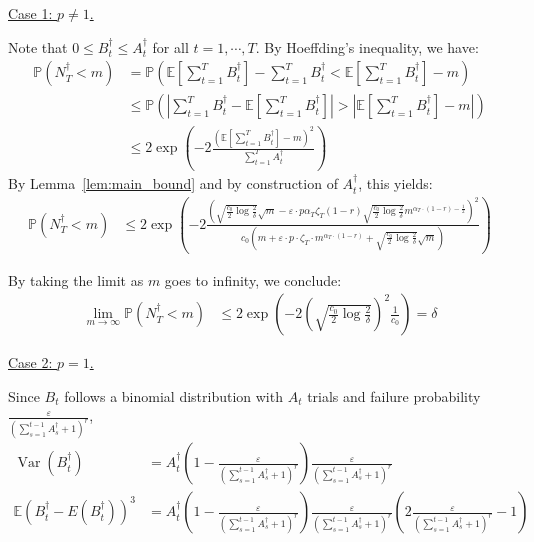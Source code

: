 \documentclass[nonblindrev]{informs3noheader}
\DeclareMathOperator{\Var}{Var}
\def\E{\mathbb{E}}
\def\P{\mathbb{P}}
\begin{document}
\underline{Case 1: $p\neq 1$.}

Note that $0\leq B^\dagger_t\leq A^\dagger_t$ for all $t=1,\cdots,T$. By Hoeffding's inequality, we have:
\begin{align*}
    \P\left(N^\dagger_T<m\right)
    &=\P\left(\E\left[\sum_{t=1}^T B^\dagger_t\right]-\sum_{t=1}^T B^\dagger_t < \E\left[\sum_{t=1}^T B^\dagger_t\right] - m\right)\\
    &\leq\P\left(\left|\sum_{t=1}^T B^\dagger_t - \E\left[\sum_{t=1}^T B^\dagger_t\right]\right|>\left|\E\left[\sum_{t=1}^T B^\dagger_t\right]-m\right|\right)\\
    &\leq2 \exp\left(-2\frac{\left(\E\left[\sum_{t=1}^T B^\dagger_t\right]-m\right)^2}{\sum_{t=1}^T A^\dagger_t}\right)
\end{align*}
By Lemma~\ref{lem:main_bound} and by construction of $A^\dagger_t$, this yields:
\begin{align*}
    \P\left(N^\dagger_T<m\right)
    &\leq 2 \exp\left(-2\frac{\left(\sqrt{\frac{c_0}{2}\log \frac{2}{\delta}}\sqrt{m} - \varepsilon\cdot p \alpha_T\zeta_T(1-r)\sqrt{\frac{c_0}{2}\log \frac{2}{\delta}}m^{\alpha_T\cdot (1-r)-\frac{1}{2}}\right)^2}{c_0\left(m+\varepsilon\cdot p \cdot \zeta_T \cdot m^{\alpha_T \cdot(1-r)}+ \sqrt{\frac{c_0}{2}\log \frac{2}{\delta}}\sqrt{m}\right)}\right)
\end{align*}

By taking the limit as $m$ goes to infinity, we conclude:
\begin{align*}
    \lim_{m \to \infty}\P\left(N^\dagger_T<m\right)
    &\leq 2 \exp\left(-2\left(\sqrt{\frac{c_0}{2}\log \frac{2}{\delta}}\right)^2\frac{1}{c_0}\right)
    = \delta
\end{align*}

\underline{Case 2: $p=1$.}

Since $B_t$ follows a binomial distribution with $A_t$ trials and failure probability $\frac{\varepsilon}{\left(\sum_{s=1}^{t-1} A^\dagger_s +1\right)^r}$,
\begin{align*}
    \Var(B^\dagger_t)&=A^\dagger_t \left(1 - \frac{\varepsilon}{\left(\sum_{s=1}^{t-1} A^\dagger_s +1\right)^r} \right) \frac{\varepsilon}{\left(\sum_{s=1}^{t-1} A^\dagger_s +1\right)^r}\\
    \E(B^\dagger_t-E(B^\dagger_t))^3&=A^\dagger_t \left(1 - \frac{\varepsilon}{\left(\sum_{s=1}^{t-1} A^\dagger_s +1\right)^r} \right) \frac{\varepsilon}{\left(\sum_{s=1}^{t-1} A^\dagger_s +1\right)^r}\left(2\frac{\varepsilon}{\left(\sum_{s=1}^{t-1} A^\dagger_s +1\right)^r}-1\right)
\end{align*}
\end{document}
